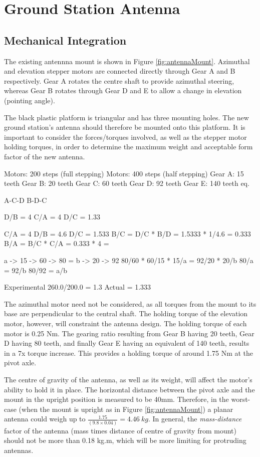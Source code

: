 \graphicspath{{./figures}}

\section{Ground Station Antenna}
\subsection{Mechanical Integration}

The existing antennna mount is shown in Figure \ref{fig:antennaMount}. Azimuthal and elevation stepper motors are connected directly through Gear A and B respectively. Gear A rotates the centre shaft to provide azimuthal steering, whereas Gear B rotates through Gear D and E to allow a change in elevation (pointing angle).

The black plastic platform is triangular and has three mounting holes. The new ground station's antenna should therefore be mounted onto this platform. It is important to consider the forces/torques involved, as well as the stepper motor holding torques, in order to determine the maximum weight and acceptable form factor of the new antenna.

Motors: 200 steps (full stepping)
Motors: 400 steps (half stepping)
Gear A: 15 teeth
Gear B: 20 teeth
Gear C: 60 teeth
Gear D: 92 teeth
Gear E: 140 teeth eq.

A-C-D
B-D-C

D/B = 4
C/A = 4
D/C = 1.33

C/A = 4
D/B = 4.6
D/C = 1.533
B/C = D/C * B/D =  1.5333 * 1/4.6 = 0.333
B/A = B/C * C/A = 0.333 * 4 = 





a -> 15 -> 60 -> 80        =      b -> 20 -> 92
80/60 * 60/15 * 15/a       = 92/20 * 20/b
80/a                       = 92/b
80/92 = a/b




Experimental 260.0/200.0 = 1.3
Actual = 1.333

The azimuthal motor need not be considered, as all torques from the mount to its base are perpendicular to the central shaft. The holding torque of the elevation motor, however, will constraint the antenna design. The holding torque of each motor is 0.25 Nm. The gearing ratio resulting from Gear B having 20 teeth, Gear D having 80 teeth, and finally Gear E having an equivalent of 140 teeth, results in a 7x torque increase. This provides a holding torque of around 1.75 Nm at the pivot axle.

The centre of gravity of the antenna, as well as its weight, will affect the motor's ability to hold it in place. The horizontal distance between the pivot axle and the mount in the upright position is measured to be 40mm. Therefore, in the worst-case (when the mount is upright as in Figure \ref{fig:antennaMount}) a planar antenna could weigh up to $\frac{1.75}{(9.8 \times 0.04)} = \SI{4.46}{kg}$. In general, the \textit{mass-distance} factor of the antenna (mass times distance of centre of gravity from mount) should not be more than 0.18 kg.m, which will be more limiting for protruding antennas.